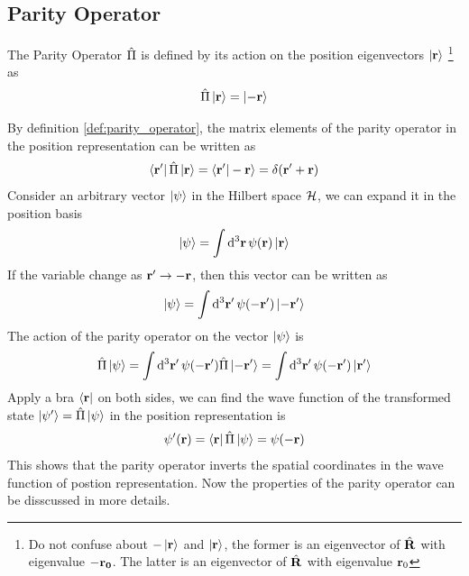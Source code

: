 \subsection{Parity Operator} \label{sec:parity_operator}
\begin{definition} \label{def:parity_operator}
    The Parity Operator $\hat{\Pi}$ is defined by its action on the position eigenvectors $\ket{\mathbf{r}}$ \footnote{Do not confuse about $- \ket{\mathbf{r}}$ and $\ket{\mathbf{r}}$, the former is an eigenvector of $\hat{\mathbf{R}}$ with eigenvalue $- \mathbf{ r_0}$. The latter is an eigenvector of $\hat{\mathbf{R}}$ with eigenvalue $\mathbf{r}_0$} as 
    \begin{align}
        \hat{\Pi} \ket{\mathbf{r}} = \ket{-\mathbf{r}} \label{eq:parity_operator_action}
    \end{align}
\end{definition}
By definition \cref{def:parity_operator}, the matrix elements of the parity operator in the position representation can be written as 
\begin{align*}
    \bra{\mathbf{r'}} \hat{\Pi} \ket{\mathbf{r}} = \braket{\mathbf{r'}|-\mathbf{r}} = \delta(\mathbf{r'} + \mathbf{r})
\end{align*}
Consider an arbitrary vector $\ket{\psi}$ in the Hilbert space $\mathcal{H}$, we can expand it in the position basis
\begin{align}
    \ket{\psi} = \int \mathrm{d}^3 \mathbf{r} \, \psi(\mathbf{r}) \ket{\mathbf{r}}
\end{align}
If the variable change as $\mathbf{r'} \rightarrow -\mathbf{r}$, then this vector can be written as
\begin{align}
    \ket{\psi} = \int \mathrm{d}^3 \mathbf{r'} \, \psi(-\mathbf{r'}) \ket{-\mathbf{r'}}
\end{align}
The action of the parity operator on the vector $\ket{\psi}$ is 
\begin{align}
    \hat{\Pi} \ket{\psi} = \int \mathrm{d}^3 \mathbf{r'} \, \psi(\mathbf{-r'}) \hat{\Pi} \ket{\mathbf{-r'}} = \int \mathrm{d}^3 \mathbf{r'} \, \psi(\mathbf{-r'}) \ket{\mathbf{r'}} 
\end{align}
Apply a bra $\bra{\mathbf{r}}$ on both sides, we can find the wave function of the transformed state $\ket{\psi'} = \hat{\Pi} \ket{\psi}$ in the position representation is
\begin{align}
    \psi'(\mathbf{r}) = \bra{\mathbf{r}} \hat{\Pi} \ket{\psi} = \psi(-\mathbf{r}) \label{eq:parity_wavefunction_x}
\end{align}
This shows that the parity operator inverts the spatial coordinates in the wave function of postion representation. Now the properties of the parity operator can be disscussed in more details.
